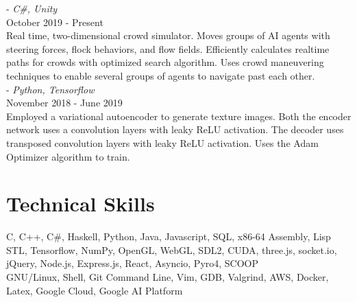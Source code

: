 \documentclass[12pt]{article}
\begin{document}
	 - \emph{C\#, Unity} \\
	\noindent October 2019 - Present \\
	\noindent Real time, two-dimensional crowd simulator. Moves groups of AI agents with steering forces, flock behaviors, and flow fields. Efficiently calculates
	realtime paths for crowds with optimized search algorithm. Uses crowd maneuvering techniques to enable several groups of agents to navigate past
	each other.\\

	 - \emph{Python, Tensorflow} \\
	\noindent November 2018 - June 2019 \\
	\noindent Employed a variational autoencoder to generate texture images. Both the encoder network uses a convolution layers with leaky ReLU activation.
	The decoder uses transposed convolution layers with leaky ReLU activation. Uses the Adam Optimizer algorithm to train.
	\noindent \\

	\section*{Technical Skills}
		 \normalsize{C, C++, C\#, Haskell, Python, Java, Javascript, SQL, x86-64 Assembly, Lisp}\\
		  \normalsize{STL, Tensorflow, NumPy, OpenGL, WebGL, SDL2, CUDA, three.js, socket.io, jQuery, Node.js, Express.js, React, Asyncio, Pyro4, SCOOP}\\
		 \normalsize{GNU/Linux, Shell, Git Command Line, Vim, GDB, Valgrind, AWS, Docker, Latex, Google Cloud, Google AI Platform}\\
\end{document}
